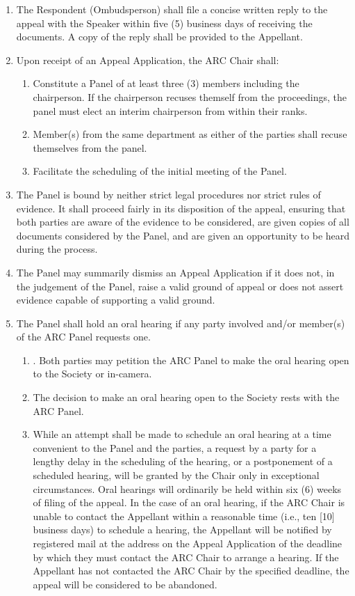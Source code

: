\begin{enumerate} [align=left]
\begin{enumerate} [label*=\arabic*., align=left]
\item The Respondent (Ombudsperson) shall file a concise written reply to the appeal with the Speaker within five (5) business days of receiving the documents. A copy of the reply shall be provided to the Appellant.
\item Upon receipt of an Appeal Application, the ARC Chair shall:
\begin{enumerate} [label*=\arabic*., align=left]
\item Constitute a Panel of at least three (3) members including the chairperson. If the chairperson recuses themself from the proceedings, the panel must elect an interim chairperson from within their ranks.
\item Member(s) from the same department as either of the parties shall recuse themselves from the panel.
\item Facilitate the scheduling of the initial meeting of the Panel.
\end{enumerate}
\item The Panel is bound by neither strict legal procedures nor strict rules of evidence. It shall proceed fairly in its disposition of the appeal, ensuring that both parties are aware of the evidence to be considered, are given copies of all documents considered by the Panel, and are given an opportunity to be heard during the process.
\item The Panel may summarily dismiss an Appeal Application if it does not, in the judgement of the Panel, raise a valid ground of appeal or does not assert evidence capable of supporting a valid ground.
\item The Panel shall hold an oral hearing if any party involved and/or member(s) of the ARC Panel requests one.
\begin{enumerate} [label*=\arabic*., align=left]
\item. Both parties may petition the ARC Panel to make the oral hearing open to the Society or in-camera.
\item The decision to make an oral hearing open to the Society rests with the ARC Panel.
\item While an attempt shall be made to schedule an oral hearing at a time convenient to the Panel and the parties, a request by a party for a lengthy delay in the scheduling of the hearing, or a postponement of a scheduled hearing, will be granted by the Chair only in exceptional circumstances. Oral hearings will ordinarily be held within six (6) weeks of filing of the appeal. In the case of an oral hearing, if the ARC Chair is unable to contact the Appellant within a reasonable time (i.e., ten [10] business days) to schedule a hearing, the Appellant will be notified by registered mail at the address on the Appeal Application of the deadline by which they must contact the ARC Chair to arrange a hearing. If the Appellant has not contacted the ARC Chair by the specified deadline, the appeal will be considered to be abandoned. 

\end{enumerate}
\end{enumerate}
\end{enumerate}
